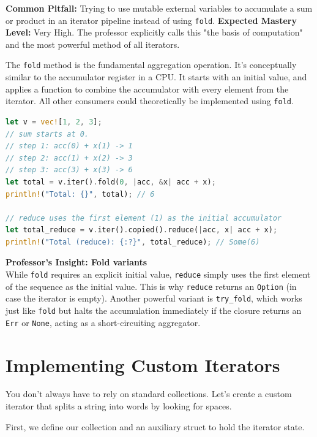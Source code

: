 \begin{examprioritybox}
\textbf{Common Pitfall:} Trying to use mutable external variables to accumulate a sum or product in an iterator pipeline instead of using \texttt{fold}.
\textbf{Expected Mastery Level:} Very High. The professor explicitly calls this "the basis of computation" and the most powerful method of all iterators. 

The \texttt{fold} method is the fundamental aggregation operation. It's conceptually similar to the accumulator register in a CPU. It starts with an initial value, and applies a function to combine the accumulator with every element from the iterator. All other consumers could theoretically be implemented using \texttt{fold}.

\begin{lstlisting}[language=Rust]
let v = vec![1, 2, 3];
// sum starts at 0. 
// step 1: acc(0) + x(1) -> 1
// step 2: acc(1) + x(2) -> 3
// step 3: acc(3) + x(3) -> 6
let total = v.iter().fold(0, |acc, &x| acc + x);
println!("Total: {}", total); // 6

// reduce uses the first element (1) as the initial accumulator
let total_reduce = v.iter().copied().reduce(|acc, x| acc + x);
println!("Total (reduce): {:?}", total_reduce); // Some(6)
\end{lstlisting}

\begin{insightbox}
\textbf{Professor's Insight: Fold variants} \\
While \texttt{fold} requires an explicit initial value, \texttt{reduce} simply uses the first element of the sequence as the initial value. This is why \texttt{reduce} returns an \texttt{Option} (in case the iterator is empty). Another powerful variant is \texttt{try\_fold}, which works just like \texttt{fold} but halts the accumulation immediately if the closure returns an \texttt{Err} or \texttt{None}, acting as a short-circuiting aggregator.
\end{insightbox}
\end{examprioritybox}

\section{Implementing Custom Iterators}

You don't always have to rely on standard collections. Let's create a custom iterator that splits a string into words by looking for spaces.

First, we define our collection and an auxiliary struct to hold the iterator state.

